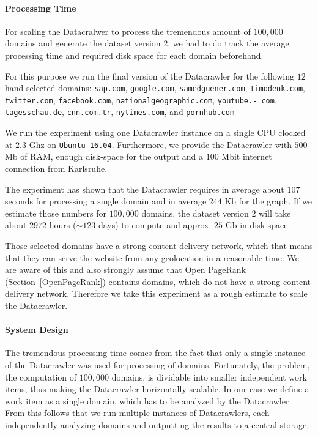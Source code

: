 \paragraph*{Processing Time}
\label{datacrawler_processing_time}
For scaling the Datacralwer to process the tremendous amount of $100,000$ domains and generate the dataset version 2, we had to do track the average processing time and required disk space for each domain beforehand.

For this purpose we run the final version of the Datacrawler for the following $12$ hand-selected domains: \texttt{sap.com}, \texttt{google.com}, \texttt{samedguener.com}, \texttt{timodenk.com}, \texttt{twitter.com}, \texttt{facebook.com}, \texttt{nationalgeographic.com}, \texttt{youtube.-
com}, \texttt{tagesschau.de}, \texttt{cnn.com.tr}, \texttt{nytimes.com}, and \texttt{pornhub.com}

We run the experiment using one Datacrawler instance on a single CPU clocked at $2.3$ Ghz on \texttt{Ubuntu 16.04}. Furthermore, we provide the Datacrawler with $500$ Mb of RAM, enough disk-space for the output and a $100$ Mbit internet connection from Karlsruhe.

The experiment has shown that the Datacrawler requires in average about $107$ seconds for processing a single domain and in average $244$ Kb for the graph. If we estimate those numbers for $100,000$ domains, the dataset version 2 will take about $2972$ hours ($\sim 123$ days) to compute and approx. $25$ Gb in disk-space.

Those selected domains have a strong content delivery network, which that means that they can serve the website from any geolocation in a reasonable time. We are aware of this and also strongly assume that Open PageRank (Section~\ref{OpenPageRank}) contains domains, which do not have a strong content delivery network. Therefore we take this experiment as a rough estimate to scale the Datacrawler.

\paragraph*{System Design}
\label{datacrawler_scale_architecture}
The tremendous processing time comes from the fact that only a single instance of the Datacrawler was used for processing of domains. Fortunately, the problem, the computation of $100,000$ domains, is dividable into smaller independent work items, thus making the Datacrawler horizontally scalable. In our case we define a work item as a single domain, which has to be analyzed by the Datacrawler. From this follows that we run multiple instances of Datacrawlers, each independently analyzing domains and outputting the results to a central storage.

